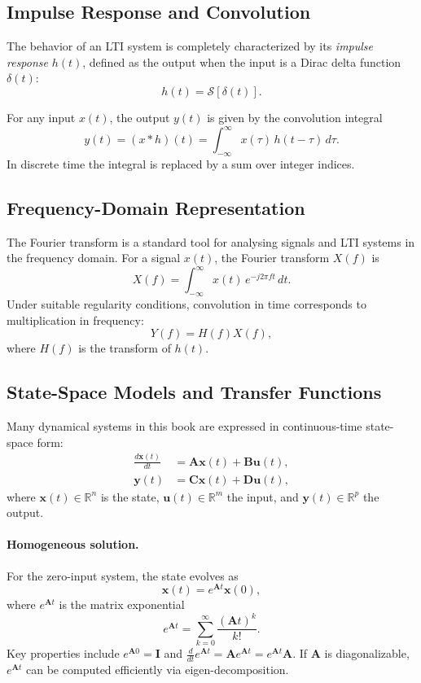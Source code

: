 \subsection*{Impulse Response and Convolution}

The behavior of an LTI system is completely characterized by its \emph{impulse response} \(h(t)\), defined as the output when the input is a Dirac delta function \(\delta(t)\):
\[
h(t) = \mathcal{S}[\delta(t)].
\]

For any input \(x(t)\), the output \(y(t)\) is given by the convolution integral
\[
    y(t) = (x * h)(t) = \int_{-\infty}^\infty x(\tau)\, h(t - \tau) \, d\tau.
\]
In discrete time the integral is replaced by a sum over integer indices.

\subsection*{Frequency-Domain Representation}

The Fourier transform is a standard tool for analysing signals and LTI systems in the frequency domain. For a signal \(x(t)\), the Fourier transform \(X(f)\) is
\[
X(f) = \int_{-\infty}^\infty x(t)\, e^{-j 2 \pi f t} \, dt.
\]
Under suitable regularity conditions, convolution in time corresponds to multiplication in frequency:
\[
Y(f) = H(f) X(f),
\]
where \(H(f)\) is the transform of \(h(t)\).

\subsection*{State-Space Models and Transfer Functions}

Many dynamical systems in this book are expressed in continuous-time state-space form:
\begin{equation}
\begin{aligned}
    \frac{d\mathbf{x}(t)}{dt} &= \mathbf{A}\mathbf{x}(t) + \mathbf{B}\mathbf{u}(t), \\
    \mathbf{y}(t) &= \mathbf{C}\mathbf{x}(t) + \mathbf{D}\mathbf{u}(t),
\end{aligned}
\label{eq:state_space}
\end{equation}
where \(\mathbf{x}(t) \in \mathbb{R}^n\) is the state, \(\mathbf{u}(t) \in \mathbb{R}^m\) the input, and \(\mathbf{y}(t) \in \mathbb{R}^p\) the output.

\paragraph{Homogeneous solution.}
For the zero-input system, the state evolves as
\[
    \mathbf{x}(t) = e^{\mathbf{A}t} \mathbf{x}(0),
\]
where \(e^{\mathbf{A}t}\) is the matrix exponential
\[
    e^{\mathbf{A}t} = \sum_{k=0}^\infty \frac{(\mathbf{A}t)^k}{k!}.
\]
Key properties include \(e^{\mathbf{A}0} = \mathbf{I}\) and \(\tfrac{d}{dt} e^{\mathbf{A}t} = \mathbf{A} e^{\mathbf{A}t} = e^{\mathbf{A}t} \mathbf{A}\). If \(\mathbf{A}\) is diagonalizable, \(e^{\mathbf{A}t}\) can be computed efficiently via eigen-decomposition.

